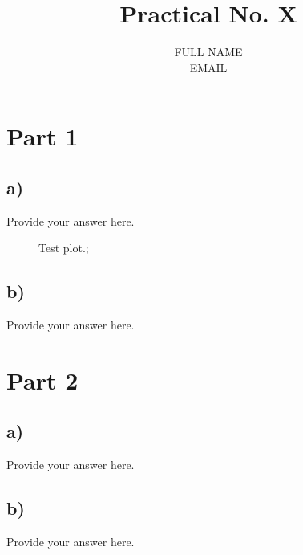 \documentclass[12pt]{article}
\begin{document}
 
 
\title{Practical No. X }%
\author{FULL NAME\\ %
EMAIL}
 
\maketitle
 
\section{Part 1 }
\subsection*{a) }
Provide your answer here.

\begin{figure}[!h]
\centering
\caption{Test plot.;}
\end{figure}

\subsection*{b) }
Provide your answer here.

 
\section{Part 2 }
\subsection*{a) }
Provide your answer here.

\subsection*{b) }
Provide your answer here. 
 
 
 
\end{document}
